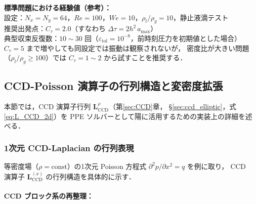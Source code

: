 \begin{tcolorbox}[defbox, title={最適仮想時間刻み $\Delta\tau$ の選択指針}]
\medskip
\textbf{標準問題における経験値（参考）：}\\
設定：$N_x=N_y=64$，$Re=100$，$We=10$，$\rho_l/\rho_g=10$，静止液滴テスト\\
推奨出発点：$C_\tau = 2.0$（すなわち $\Delta\tau = 2h^2\,a_{\max}$）\\
典型収束反復数：$10\sim30$ 回（$\varepsilon_\text{tol}=10^{-8}$，前時刻圧力を初期値とした場合）\\
$C_\tau=5$ まで増やしても同設定では振動は観察されないが，
密度比が大きい問題（$\rho_l/\rho_g \geq 100$）では $C_\tau=1\sim2$ から試すことを推奨する．
\end{tcolorbox}

\subsection{CCD-Poisson 演算子の行列構造と変密度拡張}
\label{sec:ccd_poisson_matrix}

本節では，CCD 演算子行列 $\mathbf{L}_{\mathrm{CCD}}^{\rho}$（第\ref{sec:CCD}章，
§\ref{sec:ccd_elliptic}，式 \eqref{eq:L_CCD_2d}）を
PPE ソルバーとして陽に活用するための実装上の詳細を述べる．

\subsubsection{1次元 CCD-Laplacian の行列表現}
\label{sec:ccd_1d_matrix}

等密度場（$\rho = \mathrm{const}$）の1次元 Poisson 方程式
$\partial^2 p / \partial x^2 = q$ を例に取り，
CCD 演算子 $\mathbf{L}_{\mathrm{CCD}}^{(x)}$ の行列構造を具体的に示す．

\paragraph{CCD ブロック系の再整理：}

